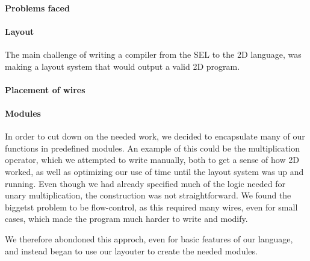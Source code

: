 

\paragraph{Problems faced}
\label{compiler:problems}

\paragraph{Layout}
\label{compiler:layout}
The main challenge of writing a compiler from the SEL to the 2D
language, was making a layout system that would output a valid 2D program. 

\paragraph{Placement of wires}
\label{compiler:placement}


\paragraph{Modules}
\label{compiler:modules}
In order to cut down on the needed work, we decided to encapsulate
many of our functions in predefined modules. An example of this could
be the multiplication operator, which we attempted to write manually,
both to get a sense of how 2D worked, as well as optimizing our use of
time until the layout system was up and running. Even though we had
already specified much of the logic needed for unary multiplication,
the construction was not straightforward. We found the biggetst
problem to be flow-control, as this required many wires, even for
small cases, which made the program much harder to write and modify.

We therefore abondoned this approch, even for basic features of our
language, and instead began to use our layouter to create the needed
modules.

